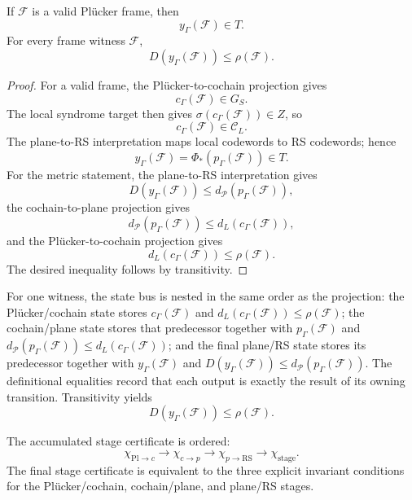 \begin{proposition}\label{prop:composed-chain}
If \(\mathcal F\) is a valid Pl\"ucker frame, then
\[
  y_\Gamma(\mathcal F)\in T.
\]
For every frame witness \(\mathcal F\),
\[
  D(y_\Gamma(\mathcal F))\le \rho(\mathcal F).
\]
\end{proposition}

\begin{proof}
For a valid frame, the Pl\"ucker-to-cochain projection gives
\[
  c_\Gamma(\mathcal F)\in G_S.
\]
The local syndrome target then gives \(\sigma(c_\Gamma(\mathcal F))\in Z\), so
\[
  c_\Gamma(\mathcal F)\in\mathcal C_L.
\]
The plane-to-RS interpretation maps local codewords to RS codewords; hence
\[
  y_\Gamma(\mathcal F)=\Phi_\ast(p_\Gamma(\mathcal F))\in T.
\]
For the metric statement, the plane-to-RS interpretation gives
\[
  D(y_\Gamma(\mathcal F))
  \le d_{\mathcal P}(p_\Gamma(\mathcal F)),
\]
the cochain-to-plane projection gives
\[
  d_{\mathcal P}(p_\Gamma(\mathcal F))
  \le d_L(c_\Gamma(\mathcal F)),
\]
and the Pl\"ucker-to-cochain projection gives
\[
  d_L(c_\Gamma(\mathcal F))\le \rho(\mathcal F).
\]
The desired inequality follows by transitivity.
\end{proof}

For one witness, the state bus is nested in the same order as the projection:
the Pl\"ucker/cochain state stores \(c_\Gamma(\mathcal F)\) and
\(d_L(c_\Gamma(\mathcal F))\le\rho(\mathcal F)\); the cochain/plane state
stores that predecessor together with \(p_\Gamma(\mathcal F)\) and
\(d_{\mathcal P}(p_\Gamma(\mathcal F))\le d_L(c_\Gamma(\mathcal F))\); and
the final plane/RS state stores its predecessor together with
\(y_\Gamma(\mathcal F)\) and
\(D(y_\Gamma(\mathcal F))\le d_{\mathcal P}(p_\Gamma(\mathcal F))\).
The definitional equalities record that each output is exactly the result of
its owning transition.  Transitivity yields
\[
  D(y_\Gamma(\mathcal F))\le \rho(\mathcal F).
\]

The accumulated stage certificate is ordered:
\[
  \chi_{\mathrm{Pl}\to c}
  \longrightarrow
  \chi_{c\to p}
  \longrightarrow
  \chi_{p\to \mathrm{RS}}
  \longrightarrow
  \chi_{\mathrm{stage}}.
\]
The final stage certificate is equivalent to the three explicit invariant
conditions for the Pl\"ucker/cochain, cochain/plane, and plane/RS stages.


